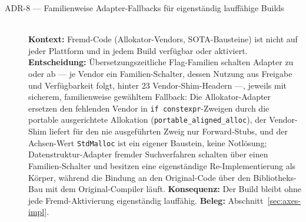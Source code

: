 \begin{description}
  \item[ADR-8 --- Familienweise Adapter-Fallbacks für eigenständig lauffähige Builds]\hfill\\
  \textbf{Kontext:} Fremd-Code (Allokator-Vendors, SOTA-Bausteine) ist nicht auf jeder Plattform
  und in jedem Build verfügbar oder aktiviert.
  \textbf{Entscheidung:} Übersetzungszeitliche Flag-Familien schalten Adapter zu oder ab --- je
  Vendor ein Familien-Schalter, dessen Nutzung aus Freigabe und Verfügbarkeit folgt, hinter 23
  Vendor-Shim-Headern ---, jeweils mit sicherem, familienweise gewähltem Fallback: Die
  Allokator-Adapter ersetzen den fehlenden Vendor in \texttt{if constexpr}-Zweigen durch die portable
  ausgerichtete Allokation (\texttt{portable\_aligned\_alloc}), der Vendor-Shim liefert für den nie
  ausgeführten Zweig nur Forward-Stubs, und der Achsen-Wert \texttt{StdMalloc} ist ein eigener
  Baustein, keine Notlösung; Datenstruktur-Adapter fremder Suchverfahren schalten über einen
  Familien-Schalter und besitzen eine eigenständige Re-Implementierung als Körper, während die Bindung an
  den Original-Code über den Bibliotheks-Bau mit dem Original-Compiler läuft.
  \textbf{Konsequenz:} Der Build bleibt ohne jede Fremd-Aktivierung eigenständig lauffähig.
  \textbf{Beleg:} Abschnitt~\ref{sec:axes-impl}.


\end{description}
